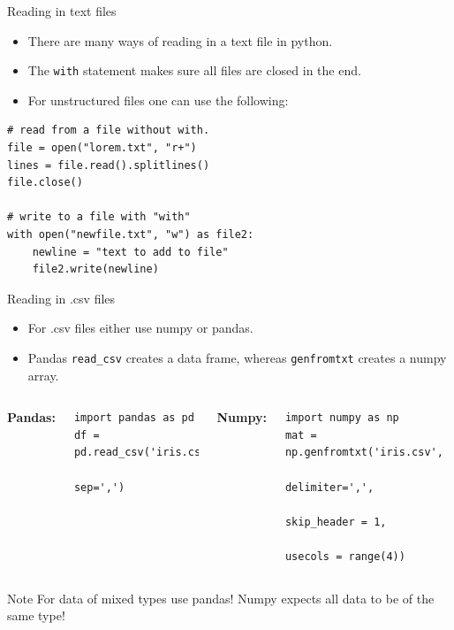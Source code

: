 \documentclass[compress%
,aspectratio=169%
]{beamer}
\newcommand{\code}{\lstinline}
\begin{document}
\begin{frame}[fragile]{Reading in text files}
\begin{itemize}
    \item There are many ways of reading in a text file in python.
    \item The \code{with} statement makes sure all files are closed in the end.
    \item For unstructured files one can use the following:
\end{itemize}

\begin{lstlisting}
# read from a file without with.
file = open("lorem.txt", "r+")
lines = file.read().splitlines()
file.close()

# write to a file with "with"
with open("newfile.txt", "w") as file2:
    newline = "text to add to file"
    file2.write(newline)
\end{lstlisting}
\end{frame}

\begin{frame}[fragile]{Reading in .csv files}
\begin{itemize}
    \item For .csv files either use numpy or pandas.
    \item Pandas \code{read_csv} creates a data frame, whereas \code{genfromtxt} creates a numpy array.
\end{itemize}
\vspace{0.5cm}
\begin{columns}

\textbf{Pandas:}
\begin{lstlisting}
import pandas as pd
df = pd.read_csv('iris.csv', 
                 sep=',')
\end{lstlisting}

\textbf{Numpy:}
\begin{lstlisting}
import numpy as np
mat = np.genfromtxt('iris.csv', 
                    delimiter=',',
                    skip_header = 1,
                    usecols = range(4))
\end{lstlisting}
\end{columns}

\begin{alertblock}{Note}
For data of mixed types use pandas! Numpy expects all data to be of the same type!
\end{alertblock}
\end{frame}
\end{document}
